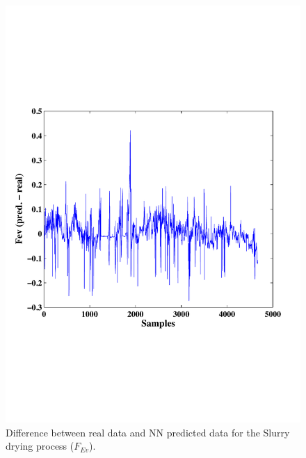 \begin{figure}
\centering
\includegraphics[width=1\textwidth]{figures/Fevdiff.pdf}
\caption{Difference between real data and NN predicted data for the Slurry drying process ($F_{Ev}$).}
\label{PEvaporator}
\end{figure}
